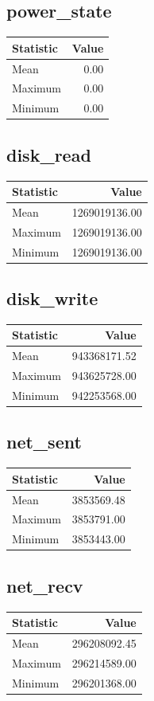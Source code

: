 \documentclass[11pt]{article}
\begin{document}
\subsection{power_state}
\begin{tabular}{lr}
\toprule
Statistic & Value \\
\midrule
Mean & 0.00 \\
Maximum & 0.00 \\
Minimum & 0.00 \\
\bottomrule
\end{tabular}


\subsection{disk_read}
\begin{tabular}{lr}
\toprule
Statistic & Value \\
\midrule
Mean & 1269019136.00 \\
Maximum & 1269019136.00 \\
Minimum & 1269019136.00 \\
\bottomrule
\end{tabular}


\subsection{disk_write}
\begin{tabular}{lr}
\toprule
Statistic & Value \\
\midrule
Mean & 943368171.52 \\
Maximum & 943625728.00 \\
Minimum & 942253568.00 \\
\bottomrule
\end{tabular}


\subsection{net_sent}
\begin{tabular}{lr}
\toprule
Statistic & Value \\
\midrule
Mean & 3853569.48 \\
Maximum & 3853791.00 \\
Minimum & 3853443.00 \\
\bottomrule
\end{tabular}


\subsection{net_recv}
\begin{tabular}{lr}
\toprule
Statistic & Value \\
\midrule
Mean & 296208092.45 \\
Maximum & 296214589.00 \\
Minimum & 296201368.00 \\
\bottomrule
\end{tabular}
\end{document}
